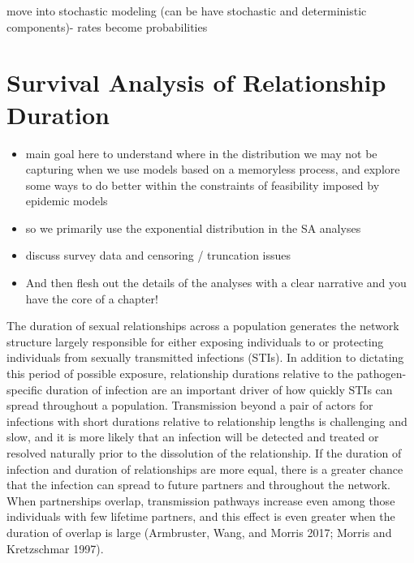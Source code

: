 \documentclass [11pt, proquest] {uwthesis}[2015/03/03]
\providecommand{\tightlist}{%
  \setlength{\itemsep}{0pt}\setlength{\parskip}{0pt}}
\begin{document}
move into stochastic modeling (can be have stochastic and deterministic
components)- rates become probabilities

\chapter{Survival Analysis of Relationship Duration}\label{surv}
\begin{itemize}
\tightlist
\item
  main goal here to understand where in the distribution we may not be
  capturing when we use models based on a memoryless process, and
  explore some ways to do better within the constraints of feasibility
  imposed by epidemic models
\item
  so we primarily use the exponential distribution in the SA analyses
\item
  discuss survey data and censoring / truncation issues
\item
  And then flesh out the details of the analyses with a clear narrative
  and you have the core of a chapter!
\end{itemize}
The duration of sexual relationships across a population generates the
network structure largely responsible for either exposing individuals to
or protecting individuals from sexually transmitted infections (STIs).
In addition to dictating this period of possible exposure, relationship
durations relative to the pathogen-specific duration of infection are an
important driver of how quickly STIs can spread throughout a population.
Transmission beyond a pair of actors for infections with short durations
relative to relationship lengths is challenging and slow, and it is more
likely that an infection will be detected and treated or resolved
naturally prior to the dissolution of the relationship. If the duration
of infection and duration of relationships are more equal, there is a
greater chance that the infection can spread to future partners and
throughout the network. When partnerships overlap, transmission pathways
increase even among those individuals with few lifetime partners, and
this effect is even greater when the duration of overlap is large
(Armbruster, Wang, and Morris 2017; Morris and Kretzschmar 1997).
\end{document}
